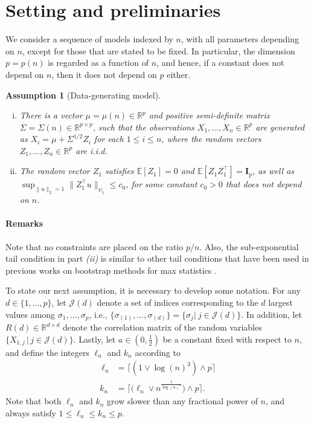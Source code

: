 \documentclass[aos,preprint]{imsart}
\numberwithin{equation}{section}
\theoremstyle{plain}
\newtheorem{assumption}{Assumption}[section]
\newcommand{\R}{\mathbb{R}}
\newcommand{\J}{\mathcal{J}}
\newcommand{\E}{\mathbb{E}}
\newcommand{\ttop}{^{\top}}
\newcommand{\ts}{\textstyle}
\newcommand{\1}{{\bf{1}}}
\newcommand{\0}{\mathbf{0}}
\def\cp{\citep}
\begin{document}
\section{Setting and preliminaries}\label{sec:prelim}


We consider a sequence of models indexed by $n$, with all parameters depending on $n$, except for those that are stated to be fixed. In particular, the dimension $p=p(n)$ is regarded as a function of $n$, and hence, if a constant does not depend on $n$, then it does not depend on $p$ either.
%
%
%
%


\noindent \begin{assumption}[Data-generating model]\label{A:model}
~\\[-0.3cm]
\begin{enumerate}[(i).]
\item There is a vector $\mu=\mu(n)\in\R^p$ and positive semi-definite matrix $\Sigma=\Sigma(n)\in\R^{p\times p}$, such that the observations $X_1,\dots,X_n\in\R^p$ are generated as $X_i=\mu+\Sigma^{1/2}Z_i$ for each $1\leq i\leq n$, where the random vectors $Z_1,\dots,Z_n\in\R^p$ are i.i.d.\\[-0.2cm]
%
%
\item The random vector $Z_1$ satisfies $\E[Z_1]=0$ \!and $\E[Z_1Z_1\ttop]=\mathbf{I}_p$, as well as $\sup_{\|u\|_2=1}\|Z_1\ttop u\|_{\psi_1}\leq c_0$, for some constant $c_0>0$ that does not depend on $n$.
%
%
\end{enumerate}
\end{assumption}
\paragraph{Remarks} Note that no constraints are placed on the ratio $p/n$.
Also, the sub-exponential tail condition in part \emph{(ii)} is similar to other tail conditions that have been used in previous works on bootstrap methods for max statistics \cp[][]{CCK:2013,Deng:2017}.
%

 To state our next assumption, it is necessary to develop some notation. For any $d\in\{1,\dots,p\}$, let $\J(d)$  denote a set of indices corresponding to the $d$ largest values among $\sigma_1,\dots,\sigma_p$, i.e., 
%
 $\{\sigma_{(1)},\dots,\sigma_{(d)}\}= \{\sigma_j| \ j\in\J(d)\}$. In addition, let $R(d)\in\R^{d\times d}$ denote the correlation 
 matrix of the random variables $\{X_{1,j}\,|\, j\in\J(d)\}$.
%
Lastly, let $a\in(0,\ts\frac{1}{2})$ be a constant fixed with respect to $n$, and define the integers $\ell_n$ and $k_n$ according to
\begin{align}\
\ell_n&=\big\lceil (1\vee \log(n)^3)\wedge p\big\rceil\\[0.2cm]
k_n&=\big\lceil \big(\ell_n\vee n^{\frac{1}{\log(n)^{a}}}\big)\wedge p\big\rceil.\label{eqn:kndef}
\end{align}
Note that both $\ell_n$ and $k_n$ grow slower than any fractional power of $n$, and always satisfy $1\leq  \ell_n\leq k_n\leq p$. 
\end{document}
